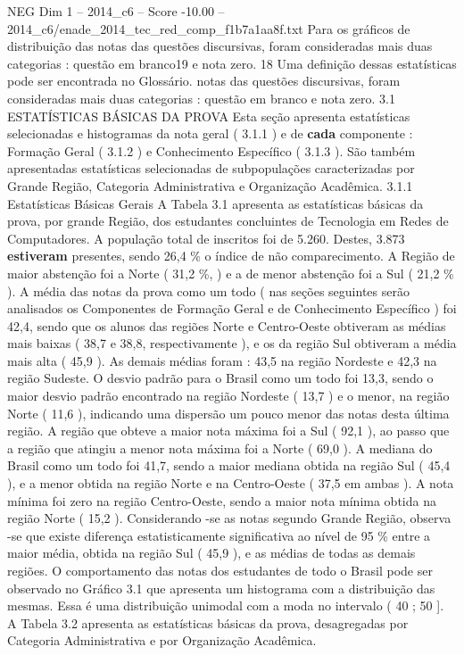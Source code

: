 \begin{textsample}{NEG Dim 1 – 2014\_c6 – Score -10.00 – 2014\_c6/enade\_2014\_tec\_red\_comp\_f1b7a1aa8f.txt}
Para os gráficos de distribuição das notas das questões discursivas, foram consideradas mais duas categorias : questão em branco19 e nota zero. 18 Uma definição dessas estatísticas pode ser encontrada no Glossário. notas das questões discursivas, foram consideradas mais duas categorias : questão em branco e nota zero. 3.1 ESTATÍSTICAS BÁSICAS DA PROVA Esta seção apresenta estatísticas selecionadas e histogramas da nota geral ( 3.1.1 ) e de \textbf{cada} componente : Formação Geral ( 3.1.2 ) e Conhecimento Específico ( 3.1.3 ).
São também apresentadas estatísticas selecionadas de subpopulações caracterizadas por Grande Região, Categoria Administrativa e Organização Acadêmica. 3.1.1 Estatísticas Básicas Gerais A Tabela 3.1 apresenta as estatísticas básicas da prova, por grande Região, dos estudantes concluintes de Tecnologia em Redes de Computadores.
A população total de inscritos foi de 5.260.
Destes, 3.873 \textbf{estiveram} presentes, sendo 26,4 \% o índice de não comparecimento.
A Região de maior abstenção foi a Norte ( 31,2 \%, ) e a de menor abstenção foi a Sul ( 21,2 \% ).
A média das notas da prova como um todo ( nas seções seguintes serão analisados os Componentes de Formação Geral e de Conhecimento Específico ) foi 42,4, sendo que os alunos das regiões Norte e Centro-Oeste obtiveram as médias mais baixas ( 38,7 e 38,8, respectivamente ), e os da região Sul obtiveram a média mais alta ( 45,9 ).
As demais médias foram : 43,5 na região Nordeste e 42,3 na região Sudeste.
O desvio padrão para o Brasil como um todo foi 13,3, sendo o maior desvio padrão encontrado na região Nordeste ( 13,7 ) e o menor, na região Norte ( 11,6 ), indicando uma dispersão um pouco menor das notas desta última região.
A região que obteve a maior nota máxima foi a Sul ( 92,1 ), ao passo que a região que atingiu a menor nota máxima foi a Norte ( 69,0 ).
A mediana do Brasil como um todo foi 41,7, sendo a maior mediana obtida na região Sul ( 45,4 ), e a menor obtida na região Norte e na Centro-Oeste ( 37,5 em ambas ).
A nota mínima foi zero na região Centro-Oeste, sendo a maior nota mínima obtida na região Norte ( 15,2 ).
Considerando -se as notas segundo Grande Região, observa -se que existe diferença estatisticamente significativa ao nível de 95 \% entre a maior média, obtida na região Sul ( 45,9 ), e as médias de todas as demais regiões.
O comportamento das notas dos estudantes de todo o Brasil pode ser observado no Gráfico 3.1 que apresenta um histograma com a distribuição das mesmas.
Essa é uma distribuição unimodal com a moda no intervalo ( 40 ; 50 ].
A Tabela 3.2 apresenta as estatísticas básicas da prova, desagregadas por Categoria Administrativa e por Organização Acadêmica.

\end{textsample}
